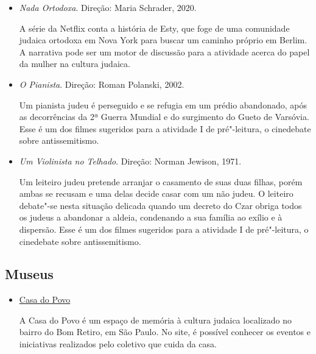\documentclass[12pt]{extarticle}
\begin{document}
\begin{itemize}
\begin{itemize}
O filme conta a história de um menino de 10 anos que sonha
em participar da Juventude Hitlerista, quando descobre que sua
mãe está escondendo uma jovem judia no sótão de sua casa.
Esse é um dos 
filmes sugeridos para a atividade I de pré"-leitura, 
o cinedebate sobre antissemitismo.

\item\textit{Nada Ortodoxa}. Direção: Maria Schrader, 2020.

A série da Netflix conta a história de Esty, que foge de uma comunidade 
judaica ortodoxa em Nova York para buscar um caminho próprio em Berlim.
A narrativa pode ser um motor de discussão para a atividade
acerca do papel da mulher na cultura judaica.

\item\textit{O Pianista}. Direção: Roman Polanski, 2002.

Um pianista judeu é perseguido e se refugia em um prédio abandonado,
após as decorrências da 2ª Guerra Mundial e do surgimento do Gueto de Varsóvia.
Esse é um dos 
filmes sugeridos para a atividade I de pré"-leitura,
o cinedebate sobre antissemitismo.

\item\textit{Um Violinista no Telhado}. Direção: Norman Jewison, 1971.

Um leiteiro judeu pretende arranjar o casamento de suas duas filhas,
porém ambas se recusam e uma delas decide casar com um não judeu. O
leiteiro debate"-se nesta situação delicada quando um decreto do Czar
obriga todos os judeus a abandonar a aldeia, condenando a sua família ao
exílio e à dispersão. Esse é um dos 
filmes sugeridos para a atividade I de pré"-leitura, 
o cinedebate sobre antissemitismo.

\end{itemize}

\subsection{Museus}

\begin{itemize}

\begin{itemize}
\item \href{https://casadopovo.org.br/}{Casa do Povo}

A Casa do Povo é um espaço de memória à cultura judaica localizado no
bairro do Bom Retiro, em São Paulo. No site, é possível conhecer
os eventos e iniciativas realizados pelo coletivo que cuida da casa.


\end{itemize}
\end{itemize}
\end{itemize}
\end{document}
